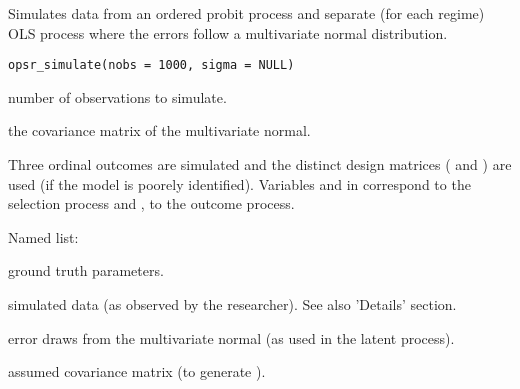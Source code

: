 %
\begin{Description}
Simulates data from an ordered probit process and separate (for each regime)
OLS process where the errors follow a multivariate normal distribution.
\end{Description}
%
\begin{Usage}
\begin{verbatim}
opsr_simulate(nobs = 1000, sigma = NULL)
\end{verbatim}
\end{Usage}
%
\begin{Arguments}
\begin{ldescription}
\item[\code{nobs}] number of observations to simulate.

\item[\code{sigma}] the covariance matrix of the multivariate normal.
\end{ldescription}
\end{Arguments}
%
\begin{Details}
Three ordinal outcomes are simulated and the distinct design matrices ( and
) are used (if  the model is poorely identified). Variables  and
 in  correspond to the selection process and ,  to the outcome
process.
\end{Details}
%
\begin{Value}
Named list:
\begin{ldescription}
\item[\code{params}] ground truth parameters.
\item[\code{data}] simulated data (as observed by the researcher). See also 'Details' section.
\item[\code{errors}] error draws from the multivariate normal (as used in the latent
process).
\item[\code{sigma}] assumed covariance matrix (to generate ).
\end{ldescription}
\end{Value}


